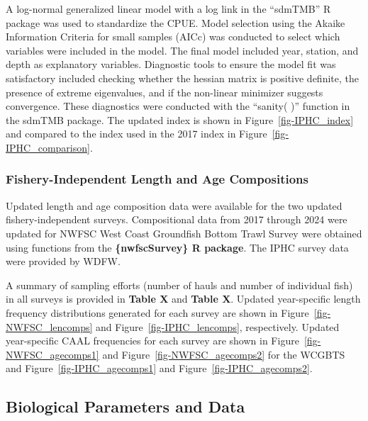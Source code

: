 \documentclass[
]{scrartcl}
\begin{document}
A log-normal generalized linear model with a log link in the ``sdmTMB''
R package was used to standardize the CPUE. Model selection using the
Akaike Information Criteria for small samples (AICc) was conducted to
select which variables were included in the model. The final model
included year, station, and depth as explanatory variables. Diagnostic
tools to ensure the model fit was satisfactory included checking whether
the hessian matrix is positive definite, the presence of extreme
eigenvalues, and if the non-linear minimizer suggests convergence. These
diagnostics were conducted with the ``sanity( )'' function in the sdmTMB
package. The updated index is shown in Figure~\ref{fig-IPHC_index} and
compared to the index used in the 2017 index in
Figure~\ref{fig-IPHC_comparison}.

\subsubsection{Fishery-Independent Length and Age
Compositions}\label{fishery-independent-length-and-age-compositions}

Updated length and age composition data were available for the two
updated fishery-independent surveys. Compositional data from 2017
through 2024 were updated for NWFSC West Coast Groundfish Bottom Trawl
Survey were obtained using functions from the \textbf{\{nwfscSurvey\} R
package}. The IPHC survey data were provided by WDFW.

A summary of sampling efforts (number of hauls and number of individual
fish) in all surveys is provided in \textbf{Table X} and \textbf{Table
X}. Updated year-specific length frequency distributions generated for
each survey are shown in Figure~\ref{fig-NWFSC_lencomps} and
Figure~\ref{fig-IPHC_lencomps}, respectively. Updated year-specific CAAL
frequencies for each survey are shown in
Figure~\ref{fig-NWFSC_agecomps1} and Figure~\ref{fig-NWFSC_agecomps2}
for the WCGBTS and Figure~\ref{fig-IPHC_agecomps1} and
Figure~\ref{fig-IPHC_agecomps2}.

\subsection{Biological Parameters and
Data}\label{biological-parameters-and-data}
\end{document}
